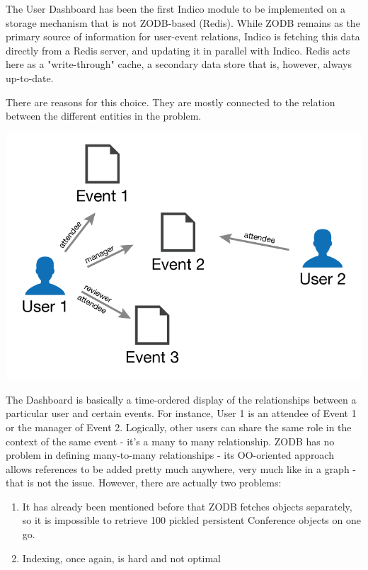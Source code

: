 The User Dashboard has been the first Indico module to be implemented on a storage mechanism that is not ZODB-based (Redis). While ZODB remains as the primary source of information for user-event relations, Indico is fetching this data directly from a Redis server, and updating it in parallel with Indico. Redis acts here as a "write-through" cache, a secondary data store that is, however, always up-to-date.

There are reasons for this choice. They are mostly connected to the relation between the different entities in the problem.

\hfill \includegraphics[scale=1]{2/figures/dashboard.png}

The Dashboard is basically a time-ordered display of the relationships between a particular user and certain events. For instance, User 1 is an attendee of Event 1 or the manager of Event 2. Logically, other users can share the same role in the context of the same event - it's a many to many relationship. ZODB has no problem in defining many-to-many relationships - its OO-oriented approach allows references to be added pretty much anywhere, very much like in a graph - that is not the issue. However, there are actually two problems:

\begin{enumerate}
  \item It has already been mentioned before that ZODB fetches objects separately, so it is impossible to retrieve 100 pickled persistent Conference objects on one go.
  \item Indexing, once again, is hard and not optimal
\end{enumerate}

